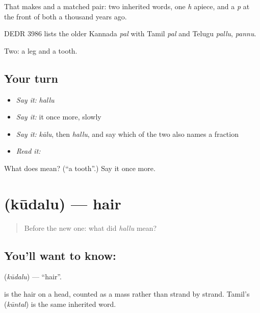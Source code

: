 That makes  and  a matched pair: two inherited words, one \emph{h} apiece, and a \emph{p} at the front of both a thousand years ago.

DEDR 3986 lists the older Kannada \emph{pal} with Tamil \emph{pal} and Telugu \emph{pallu}, \emph{pannu}.

\begin{grammarlens}[title={What you've built}]
Two: a leg and a tooth.
\end{grammarlens}

\subsection*{Your turn}
\begin{itemize}
\raggedright
  \item \emph{Say it:} \emph{hallu}
  \item \emph{Say it:} it once more, slowly
  \item \emph{Say it:} \emph{kālu}, then \emph{hallu}, and say which of the two also names a fraction
  \item \emph{Read it:} \textbf{}
\end{itemize}

\begin{tcolorbox}[breakable,colback=teal!4,colframe=teal!35!black,title={Before you move on}]
What does  mean? (\textquotedblleft{}a tooth\textquotedblright{}.) Say it once more.
\end{tcolorbox}
\section[\texorpdfstring{\kn{ಕೂದಲು} (kūdalu)}{ಕೂದಲು (kūdalu)}]{ (kūdalu) — hair}

\label{lesson:KA-C47-hair}



\begin{quote}
Before the new one: what did \emph{hallu} mean?
\end{quote}

\subsection*{You'll want to know: }
\textbf{} (\emph{kūdalu}) — \textquotedblleft{}hair\textquotedblright{}.

 is the hair on a head, counted as a mass rather than strand by strand. Tamil's  (\emph{kūntal}) is the same inherited word.

